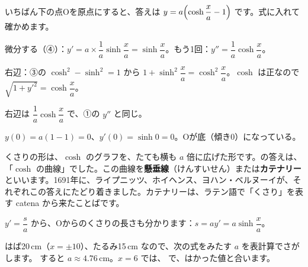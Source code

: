 いちばん下の点Oを原点にすると、答えは $y=a\Bigl(\cosh\dfrac{x}{a}-1\Bigr)$ です。式に入れて確かめます。
\begin{enumerate}[label={\bkcircled[\bkTF]{\arabic*}}, leftmargin=2.4\zw, itemsep=2pt, topsep=2pt]
\item 微分する（④）：$y'=a\times\dfrac{1}{a}\sinh\dfrac{x}{a}=\sinh\dfrac{x}{a}$。もう1回：$y''=\dfrac{1}{a}\cosh\dfrac{x}{a}$。
\item 右辺：③の $\cosh^2-\sinh^2=1$ から $1+\sinh^2\dfrac{x}{a}=\cosh^2\dfrac{x}{a}$。$\cosh$ は正なので $\sqrt{1+y'^2}=\cosh\dfrac{x}{a}$。
\item 右辺は $\dfrac{1}{a}\cosh\dfrac{x}{a}$ で、①の $y''$ と同じ。
\item $y(0)=a(1-1)=0$、$y'(0)=\sinh0=0$。Oが底（傾き0）になっている。
\end{enumerate}
くさりの形は、$\cosh$ のグラフを、たても横も $a$ 倍に広げた形です。\bkhatenaref の答えは、「$\cosh$ の曲線」でした。この曲線を\textbf{懸垂線}（けんすいせん）または\textbf{カテナリー}といいます。1691年に、ライプニッツ、ホイヘンス、ヨハン・ベルヌーイが、それぞれこの答えにたどり着きました。カテナリーは、ラテン語で「くさり」を表す catena から来たことばです。

$y'=\dfrac{s}{a}$ から、Oからのくさりの長さも分かります：$s=ay'=a\sinh\dfrac{x}{a}$。

はば20\,cm（$x=\pm10$）、たるみ15\,cm なので、次の式をみたす $a$ を表計算でさがします。
すると $a\approx4.76$\,cm。$x=6$ では、
で、はかった値と合います。

